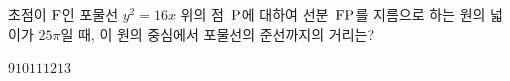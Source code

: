 초점이 $\mathrm{F}$인 포물선 $y^2=16x$ 위의 점~$\mathrm{P}$에 대하여 선분~$\mathrm{FP}$를 지름으로 하는 원의 넓이가 $25\pi$일 때, 이 원의 중심에서 포물선의 준선까지의 거리는?
\begin{choices32}{$9$}{$10$}{$11$}{$12$}{$13$}\end{choices32}
